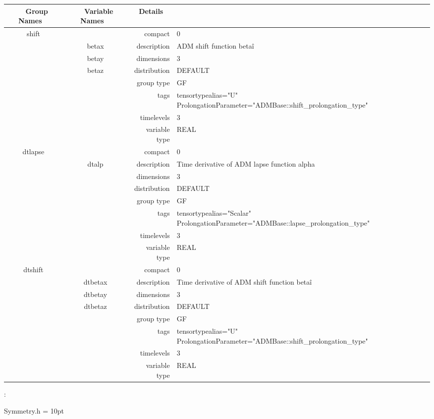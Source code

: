\begin{tabular*}{150mm}{|c|c@{\extracolsep{\fill}}|rl|} \hline 
~ {\bf Group Names} ~ & ~ {\bf Variable Names} ~  &{\bf Details} ~ & ~ \\ 
\hline 
shift &  & compact & 0 \\ 
 & betax & description & ADM shift function beta\^i \\ 
 & betay & dimensions & 3 \\ 
 & betaz & distribution & DEFAULT \\ 
 &  & group type & GF \\ 
 &  & tags & tensortypealias="U" ProlongationParameter="ADMBase::shift\_prolongation\_type" \\ 
 &  & timelevels & 3 \\ 
 &  & variable type & REAL \\ 
\hline 
dtlapse &  & compact & 0 \\ 
 & dtalp & description & Time derivative of ADM lapse function alpha \\ 
 &  & dimensions & 3 \\ 
 &  & distribution & DEFAULT \\ 
 &  & group type & GF \\ 
 &  & tags & tensortypealias="Scalar" ProlongationParameter="ADMBase::lapse\_prolongation\_type" \\ 
 &  & timelevels & 3 \\ 
 &  & variable type & REAL \\ 
\hline 
dtshift &  & compact & 0 \\ 
 & dtbetax & description & Time derivative of ADM shift function beta\^i \\ 
 & dtbetay & dimensions & 3 \\ 
 & dtbetaz & distribution & DEFAULT \\ 
 &  & group type & GF \\ 
 &  & tags & tensortypealias="U" ProlongationParameter="ADMBase::shift\_prolongation\_type" \\ 
 &  & timelevels & 3 \\ 
 &  & variable type & REAL \\ 
\hline 
\end{tabular*} 



\vspace{5mm}

: 

Symmetry.h
\vspace{2mm}\parskip = 10pt 
